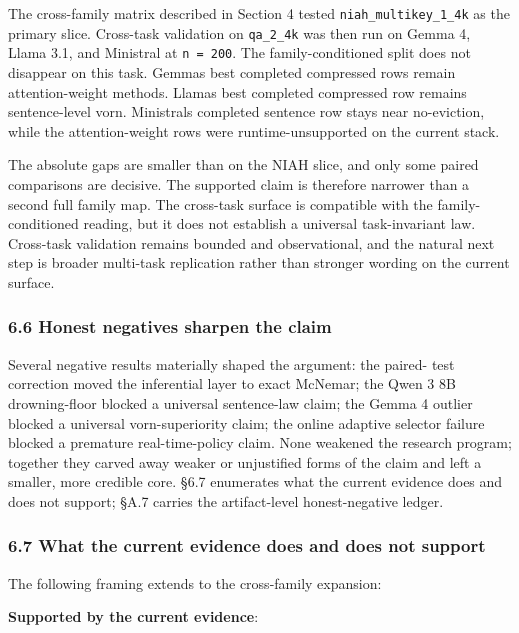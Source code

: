 \documentclass[
]{article}
\begin{document}
The cross-family matrix described in Section 4 tested
\texttt{niah\_multikey\_1\_4k} as the primary slice. Cross-task
validation on \texttt{qa\_2\_4k} was then run on Gemma 4, Llama 3.1, and
Ministral at \texttt{n\ =\ 200}. The family-conditioned split does
not disappear on this task. Gemma\textquotesingle s best completed
compressed rows remain attention-weight methods. Llama\textquotesingle s
best completed compressed row remains sentence-level vorn.
Ministral\textquotesingle s completed sentence row stays near
no-eviction, while the attention-weight rows were runtime-unsupported on
the current stack.

The absolute gaps are smaller than on the NIAH slice, and only some
paired comparisons are decisive. The supported claim is therefore
narrower than a second full family map. The cross-task surface is
compatible with the family-conditioned reading, but it does not
establish a universal task-invariant law. Cross-task validation remains
bounded and observational, and the natural next step is broader
multi-task replication rather than stronger wording on the current
surface.

\subsubsection{6.6 Honest negatives sharpen the
claim}\label{66-honest-negatives-sharpen-the-claim}

Several negative results materially shaped the argument: the paired-
test correction moved the inferential layer to exact McNemar; the Qwen
3 8B drowning-floor blocked a universal sentence-law claim; the Gemma
4 outlier blocked a universal vorn-superiority claim; the online
adaptive selector failure blocked a premature real-time-policy claim.
None weakened the research program; together they carved away weaker
or unjustified forms of the claim and left a smaller, more credible
core. §6.7 enumerates what the current evidence does and does not
support; §A.7 carries the artifact-level honest-negative ledger.

\subsubsection{6.7 What the current evidence does and does not
support}\label{67-what-the-current-evidence-does-and-does-not-support}

The following framing extends to the cross-family expansion:

\textbf{Supported by the current evidence}:
\end{document}
